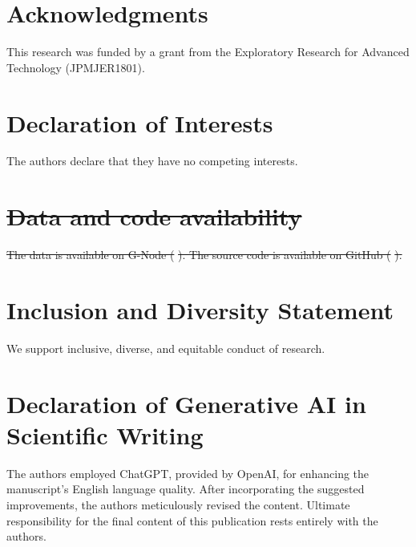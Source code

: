 \documentclass[preprint,review,12pt]{elsarticle}%
\providecommand{\DIFdeltex}[1]{{\protect\color{red}\sout{#1}}}                      %
\providecommand{\DIFdelbegin}{} %
\providecommand{\DIFdelend}{} %
\providecommand{\DIFdel}[1]{\texorpdfstring{\DIFdeltex{#1}}{}} %
\newcommand{\DIFscaledelfig}{0.5}
\newlength{\DIFdelgraphicswidth} %
\newlength{\DIFdelgraphicsheight} %
\newcommand{\DIFdelincludegraphics}[2][]{%
\sbox{\DIFdelgraphicsbox}{\DIFOincludegraphics[#1]{#2}}%
\settoboxwidth{\DIFdelgraphicswidth}{\DIFdelgraphicsbox} %
\settoboxtotalheight{\DIFdelgraphicsheight}{\DIFdelgraphicsbox} %
\scalebox{\DIFscaledelfig}{%
\parbox[b]{\DIFdelgraphicswidth}{\usebox{\DIFdelgraphicsbox}\\[-\baselineskip] \rule{\DIFdelgraphicswidth}{0em}}\llap{\resizebox{\DIFdelgraphicswidth}{\DIFdelgraphicsheight}{%
\setlength{\unitlength}{\DIFdelgraphicswidth}%
\begin{picture}(1,1)%
\thicklines\linethickness{2pt} %
{\color[rgb]{1,0,0}\put(0,0){\framebox(1,1){}}}%
{\color[rgb]{1,0,0}\put(0,0){\line( 1,1){1}}}%
{\color[rgb]{1,0,0}\put(0,1){\line(1,-1){1}}}%
\end{picture}%
}\hspace*{3pt}}} %
} %
\DeclareRobustCommand{\DIFdelbegin}{\DIFOdelbegin \let\includegraphics\DIFdelincludegraphics} %
\DeclareRobustCommand{\DIFdelend}{\DIFOaddend \let\includegraphics\DIFOincludegraphics} %
\begin{document}
\section*{Acknowledgments}
This research was funded by a grant from the Exploratory Research for Advanced Technology (JPMJER1801).
\label{acknowledgments}

\section*{Declaration of Interests}
The authors declare that they have no competing interests.
\label{declaration of interests}

\DIFdelbegin %
\section*{\DIFdel{Data and code availability}}
\DIFdel{The data is available on G-Node (}%
\DIFdel{). The source code is available on GitHub (}%
\DIFdel{).
}%

\DIFdelend {}        
\section*{Inclusion and Diversity Statement}
We support inclusive, diverse, and equitable conduct of research.
\label{inclusion and diversity statement}

\section*{Declaration of Generative AI in Scientific Writing}
The authors employed ChatGPT, provided by OpenAI, for enhancing the manuscript's English language quality. After incorporating the suggested improvements, the authors meticulously revised the content. Ultimate responsibility for the final content of this publication rests entirely with the authors.
\label{declaration of generative ai in scientific writing}
\end{document}
